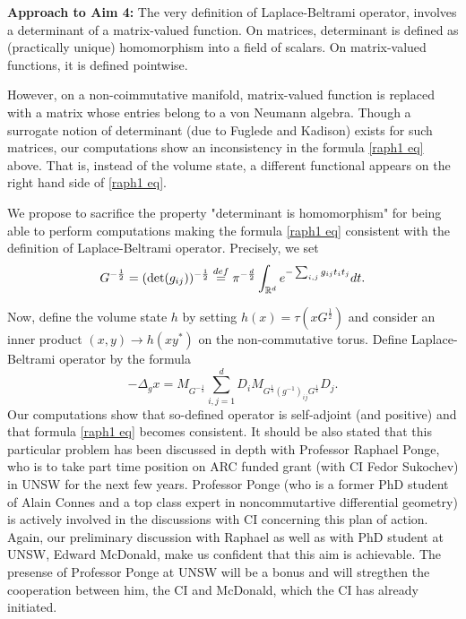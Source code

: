 \documentclass{article}
\begin{document}
{\bf Approach to Aim 4:} The very definition of Laplace-Beltrami operator, involves a determinant of a matrix-valued function. On matrices, determinant is defined as (practically unique) homomorphism into a field of scalars. On matrix-valued functions, it is defined pointwise.

However, on a non-coimmutative manifold, matrix-valued function is replaced with a matrix whose entries belong to a von Neumann algebra. Though a surrogate notion of determinant (due to Fuglede and Kadison) exists for such matrices, our computations show an inconsistency in the formula \eqref{raph1 eq} above. That is, instead of the volume state, a different functional appears on the right hand side of \eqref{raph1 eq}.

We propose to sacrifice the property "determinant is homomorphism" for being able to perform computations making the formula \eqref{raph1 eq} consistent with the definition of Laplace-Beltrami operator. Precisely, we set 
$$G^{-\frac12}=({\rm det}(g_{ij}))^{-\frac12}\stackrel{def}{=}\pi^{-\frac{d}{2}}\int_{\mathbb{R}^d}e^{-\sum_{i,j}g_{ij}t_it_j}dt.$$

Now, define the volume state $h$ by setting $h(x)=\tau(xG^{\frac12})$ and consider an inner product $(x,y)\to h(xy^*)$ on the non-commutative torus. Define Laplace-Beltrami operator by the formula
$$-\Delta_g x=M_{G^{-\frac12}}\sum_{i,j=1}^dD_iM_{G^{\frac14}(g^{-1})_{ij}G^{\frac14}}D_j.$$
Our computations show that so-defined operator is self-adjoint (and positive) and that formula \eqref{raph1 eq} becomes consistent. It should be also stated that this particular problem has been discussed in depth with Professor Raphael Ponge, who is to take part time position on ARC funded grant (with CI Fedor Sukochev) in UNSW for the next few years. Professor Ponge (who is a former PhD student of Alain Connes and a top class expert in noncommutartive differential geometry) is actively involved in the discussions with CI concerning this plan of action. Again, our preliminary discussion with Raphael as well as with PhD student at UNSW, Edward McDonald, make us confident that this aim is achievable. The presense of Professor Ponge at UNSW will be a bonus and will stregthen the cooperation between him, the CI and McDonald, which the CI has already initiated.
\end{document}
